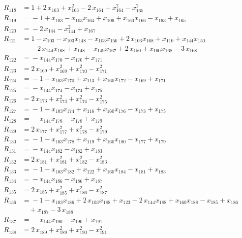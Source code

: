 \begin{align*}
R_{118} &={} 1 +2\,x_{163} +x_{163}^{2} -2\,x_{164} +x_{164}^{2} -x_{165}^{2} \\[2pt]
R_{119} &={} -1 +x_{103} -x_{103} x_{164} +x_{109} +x_{160} x_{166} -x_{163} +x_{165} \\[2pt]
R_{120} &={} -2\,x_{144} -x_{144}^{2} +x_{167} \\[2pt]
R_{121} &={} 1 -x_{103} -x_{103} x_{148} -x_{103} x_{150} +2\,x_{103} x_{168} +x_{110} +x_{144} x_{150} \\
&\quad{} -2\,x_{144} x_{168} +x_{148} -x_{149} x_{167} +2\,x_{150} +x_{160} x_{168} -3\,x_{168} \\[2pt]
R_{122} &={} -x_{144} x_{170} -x_{170} +x_{171} \\[2pt]
R_{123} &={} 2\,x_{169} +x_{169}^{2} +x_{170}^{2} -x_{171}^{2} \\[2pt]
R_{124} &={} -1 -x_{103} x_{170} +x_{113} +x_{160} x_{172} -x_{169} +x_{171} \\[2pt]
R_{125} &={} -x_{144} x_{174} -x_{174} +x_{175} \\[2pt]
R_{126} &={} 2\,x_{173} +x_{173}^{2} +x_{174}^{2} -x_{175}^{2} \\[2pt]
R_{127} &={} -1 -x_{103} x_{174} +x_{116} +x_{160} x_{176} -x_{173} +x_{175} \\[2pt]
R_{128} &={} -x_{144} x_{178} -x_{178} +x_{179} \\[2pt]
R_{129} &={} 2\,x_{177} +x_{177}^{2} +x_{178}^{2} -x_{179}^{2} \\[2pt]
R_{130} &={} -1 -x_{103} x_{178} +x_{119} +x_{160} x_{180} -x_{177} +x_{179} \\[2pt]
R_{131} &={} -x_{144} x_{182} -x_{182} +x_{183} \\[2pt]
R_{132} &={} 2\,x_{181} +x_{181}^{2} +x_{182}^{2} -x_{183}^{2} \\[2pt]
R_{133} &={} -1 -x_{103} x_{182} +x_{122} +x_{160} x_{184} -x_{181} +x_{183} \\[2pt]
R_{134} &={} -x_{144} x_{186} -x_{186} +x_{187} \\[2pt]
R_{135} &={} 2\,x_{185} +x_{185}^{2} +x_{186}^{2} -x_{187}^{2} \\[2pt]
R_{136} &={} -1 -x_{103} x_{186} +2\,x_{103} x_{188} +x_{123} -2\,x_{144} x_{188} +x_{160} x_{188} -x_{185} +x_{186} \\
&\quad{} +x_{187} -3\,x_{188} \\[2pt]
R_{137} &={} -x_{144} x_{190} -x_{190} +x_{191} \\[2pt]
R_{138} &={} 2\,x_{189} +x_{189}^{2} +x_{190}^{2} -x_{191}^{2} \\[2pt]

\end{align*}
